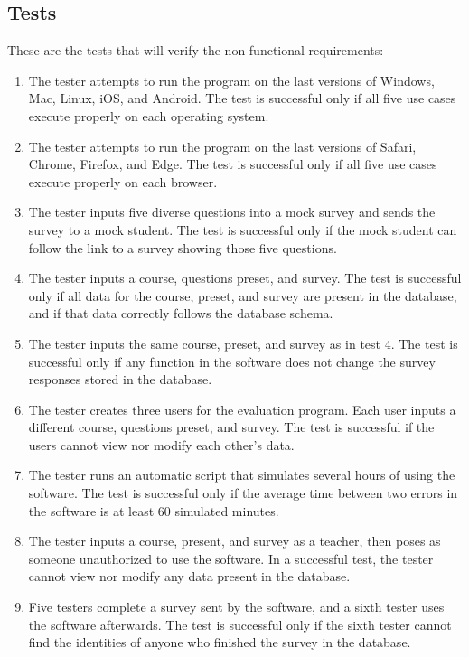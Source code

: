 \documentclass{article}
\begin{document}
\subsection{Tests}

These are the tests that will verify the non-functional requirements:

\begin{enumerate}
  \item The tester attempts to run the program on the last versions of Windows, Mac, Linux, iOS, and Android. The test is successful only if all five use cases execute properly on each operating system.
  \item The tester attempts to run the program on the last versions of Safari, Chrome, Firefox, and Edge. The test is successful only if all five use cases execute properly on each browser.
  \item The tester inputs five diverse questions into a mock survey and sends the survey to a mock student. The test is successful only if the mock student can follow the link to a survey showing those five questions.
  \item The tester inputs a course, questions preset, and survey. The test is successful only if all data for the course, preset, and survey are present in the database, and if that data correctly follows the database schema.
  \item The tester inputs the same course, preset, and survey as in test 4. The test is successful only if any function in the software does not change the survey responses stored in the database.
  \item The tester creates three users for the evaluation program. Each user inputs a different course, questions preset, and survey. The test is successful if the users cannot view nor modify each other's data.
  \item The tester runs an automatic script that simulates several hours of using the software. The test is successful only if the average time between two errors in the software is at least 60 simulated minutes.
  \item The tester inputs a course, present, and survey as a teacher, then poses as someone unauthorized to use the software. In a successful test, the tester cannot view nor modify any data present in the database.
  \item Five testers complete a survey sent by the software, and a sixth tester uses the software afterwards. The test is successful only if the sixth tester cannot find the identities of anyone who finished the survey in the database.

\end{enumerate}
\end{document}
